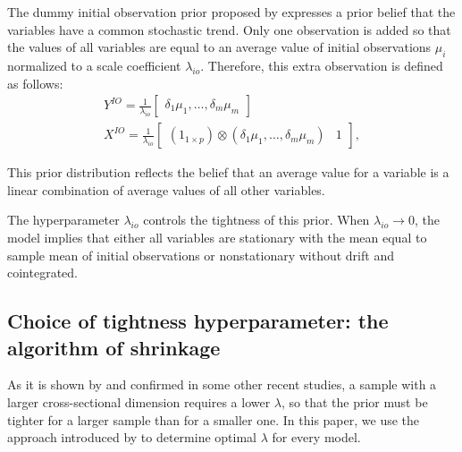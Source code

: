 \documentclass[11pt]{article} %
\newcommand{\post}{\overline}
\begin{document}
The dummy initial observation prior proposed by  \cite{sims_1993} expresses a prior belief that the variables have a common stochastic trend. Only one observation is added so that the values of all variables are equal to an average value of initial observations $\mu_i$ normalized to a scale coefficient $\lambda_{io}$. Therefore, this extra observation is defined as follows:
\begin{gather}
Y^{IO}=\frac{1}{\lambda_{io}}\begin{bmatrix}
\delta_1\mu_1,\ldots,\delta_m\mu_m
\end{bmatrix}\\
X^{IO}=\frac{1}{\lambda_{io}}\begin{bmatrix}
(1_{1\times p})\otimes (\delta_1\mu_1,\ldots,\delta_m\mu_m) &1
\end{bmatrix},
\end{gather}

This prior distribution reflects the belief that an average value for a variable is a linear combination of average values of all other variables.

The hyperparameter $\lambda_{io}$ controls the tightness of this prior. When $\lambda_{io}\to 0 $, the model implies that either all variables are stationary with the mean equal to sample mean of initial observations or nonstationary without drift and cointegrated. 


\subsection{Choice of tightness hyperparameter: the algorithm of shrinkage}

As it is shown by \cite{demol_al_2008} and confirmed in some other recent studies, a sample with a larger cross-sectional dimension requires a lower  $\lambda$, so that the prior must be tighter for a larger sample than for a smaller one. In this paper, we use the approach introduced by \cite{banbura_al_2010} to determine optimal $\lambda$ for every model. 
\end{document}
